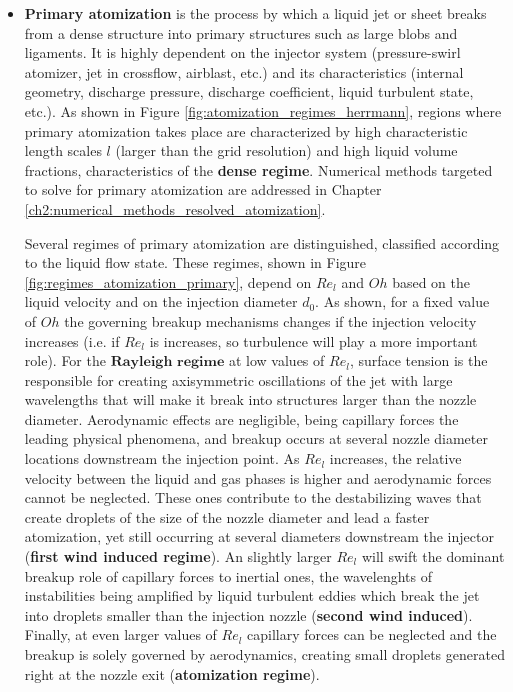 \begin{itemize}

	\item \textbf{Primary atomization} is the process by which a liquid jet or sheet breaks from a dense structure into primary structures such as large blobs and ligaments. It is highly dependent on the injector system (pressure-swirl atomizer, jet in crossflow, airblast, etc.) and its characteristics (internal geometry, discharge pressure, discharge coefficient, liquid turbulent state, etc.). As shown in Figure \ref{fig:atomization_regimes_herrmann}, regions where primary atomization takes place are characterized by high characteristic length scales $l$ (larger than the grid resolution) and high liquid volume fractions, characteristics of the \textbf{dense regime}. Numerical methods targeted to solve for primary atomization are addressed in Chapter \ref{ch2:numerical_methods_resolved_atomization}. 
	
	Several regimes of primary atomization are distinguished, classified according to the liquid flow state. These regimes, shown in Figure \ref{fig:regimes_atomization_primary}, depend on $Re_l$ and $Oh$ based on the liquid velocity and on the injection diameter $d_0$. As shown, for a fixed value of $Oh$ the governing breakup mechanisms changes if the injection velocity increases (i.e. if $Re_l$ is increases, so turbulence will play a more important role). For the $\textbf{Rayleigh regime}$ at low values of $Re_l$, surface tension is the responsible for creating axisymmetric oscillations of the jet with large wavelengths that will make it break into structures larger than the nozzle diameter. Aerodynamic effects are negligible, being capillary forces the leading physical phenomena, and breakup occurs at several nozzle diameter locations downstream the injection point. As $Re_l$ increases, the relative velocity between the liquid and gas phases is higher and aerodynamic forces cannot be neglected. These ones contribute to the destabilizing waves that create droplets of the size of the nozzle diameter and lead a faster atomization, yet still occurring at several diameters downstream the injector (\textbf{first wind induced regime}). An slightly larger $Re_l$ will swift the dominant breakup role of capillary forces to inertial ones, the wavelenghts of instabilities being amplified by liquid turbulent eddies which break the jet into droplets smaller than the injection nozzle (\textbf{second wind induced}). Finally, at even larger values of $Re_l$ capillary forces can be neglected and the breakup is solely governed by aerodynamics, creating small droplets generated right at the nozzle exit (\textbf{atomization regime}).


\end{itemize}
